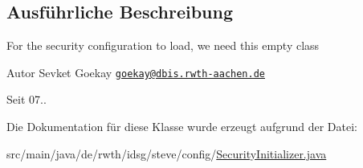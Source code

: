 \subsection{Ausführliche Beschreibung}
For the security configuration to load, we need this empty class

\begin{DoxyAuthor}{Autor}
Sevket Goekay \href{mailto:goekay@dbis.rwth-aachen.de}{\tt goekay@dbis.\-rwth-\/aachen.\-de} 
\end{DoxyAuthor}
\begin{DoxySince}{Seit}
07.. 
\end{DoxySince}


Die Dokumentation für diese Klasse wurde erzeugt aufgrund der Datei\-:\begin{DoxyCompactItemize}
\item 
src/main/java/de/rwth/idsg/steve/config/\hyperlink{_security_initializer_8java}{Security\-Initializer.\-java}\end{DoxyCompactItemize}
